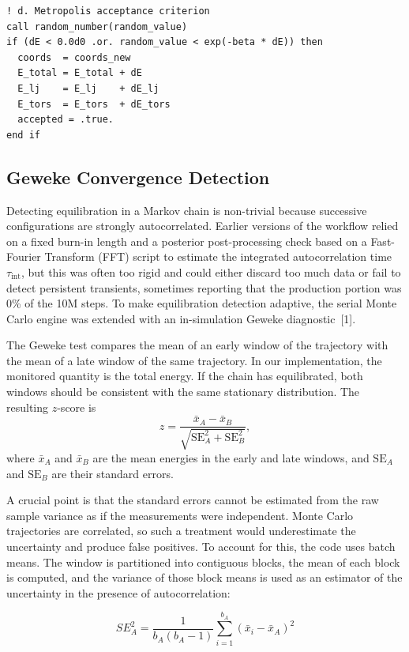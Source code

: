 \begin{lstlisting}
! d. Metropolis acceptance criterion
call random_number(random_value)
if (dE < 0.0d0 .or. random_value < exp(-beta * dE)) then
  coords  = coords_new
  E_total = E_total + dE
  E_lj    = E_lj    + dE_lj
  E_tors  = E_tors  + dE_tors
  accepted = .true.
end if
\end{lstlisting}
 
\subsection{Geweke Convergence Detection}

Detecting equilibration in a Markov chain is non-trivial because
successive configurations are strongly autocorrelated. Earlier versions
of the workflow relied on a fixed burn-in length and a posterior
post-processing check based on a Fast-Fourier Transform (FFT) script to
estimate the integrated autocorrelation time $\tau_\mathrm{int}$, but
this was often too rigid and could either discard too much data or fail
to detect persistent transients, sometimes reporting that the production
portion was 0\% of the 10M steps. To make equilibration detection
adaptive, the serial Monte Carlo engine was extended with an
in-simulation Geweke diagnostic~[1].

The Geweke test compares the mean of an early window of the trajectory
with the mean of a late window of the same trajectory. In our
implementation, the monitored quantity is the total energy. If the chain
has equilibrated, both windows should be consistent with the same
stationary distribution. The resulting $z$-score is
\[
z = \frac{\bar{x}_A - \bar{x}_B}
        {\sqrt{\mathrm{SE}_A^2 + \mathrm{SE}_B^2}},
\]
where $\bar{x}_A$ and $\bar{x}_B$ are the mean energies in the early
and late windows, and $\mathrm{SE}_A$ and $\mathrm{SE}_B$ are their
standard errors.

A crucial point is that the standard errors cannot be estimated from the
raw sample variance as if the measurements were independent. Monte Carlo
trajectories are correlated, so such a treatment would underestimate the
uncertainty and produce false positives. To account for this, the code
uses batch means. The window is partitioned into contiguous blocks, the
mean of each block is computed, and the variance of those block means is
used as an estimator of the uncertainty in the presence of
autocorrelation:

\begin{equation}
  SE_A^2 = \frac{1}{b_A(b_A-1)}\sum_{i=1}^{b_A}\left(\bar{x}_i - \bar{x}_A\right)^2
\end{equation}

